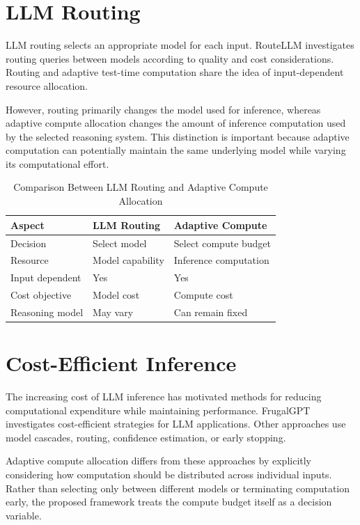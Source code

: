 \documentclass[12pt,a4paper,titlepage]{report}
\begin{document}
\section{LLM Routing}

LLM routing selects an appropriate model for each input. RouteLLM investigates routing queries between models according to quality and cost considerations. Routing and adaptive test-time computation share the idea of input-dependent resource allocation.

However, routing primarily changes the model used for inference, whereas adaptive compute allocation changes the amount of inference computation used by the selected reasoning system. This distinction is important because adaptive computation can potentially maintain the same underlying model while varying its computational effort.

\begin{table}[H]
\centering
\caption{Comparison Between LLM Routing and Adaptive Compute Allocation}
\label{tab:routing}
\small
\begin{tabular}{p{3.2cm}p{4.7cm}p{4.7cm}}
\toprule
\textbf{Aspect} & \textbf{LLM Routing} & \textbf{Adaptive Compute} \\
\midrule
Decision & Select model & Select compute budget \\
Resource & Model capability & Inference computation \\
Input dependent & Yes & Yes \\
Cost objective & Model cost & Compute cost \\
Reasoning model & May vary & Can remain fixed \\
\bottomrule
\end{tabular}
\end{table}

\section{Cost-Efficient Inference}

The increasing cost of LLM inference has motivated methods for reducing computational expenditure while maintaining performance. FrugalGPT investigates cost-efficient strategies for LLM applications. Other approaches use model cascades, routing, confidence estimation, or early stopping.

Adaptive compute allocation differs from these approaches by explicitly considering how computation should be distributed across individual inputs. Rather than selecting only between different models or terminating computation early, the proposed framework treats the compute budget itself as a decision variable.
\end{document}
